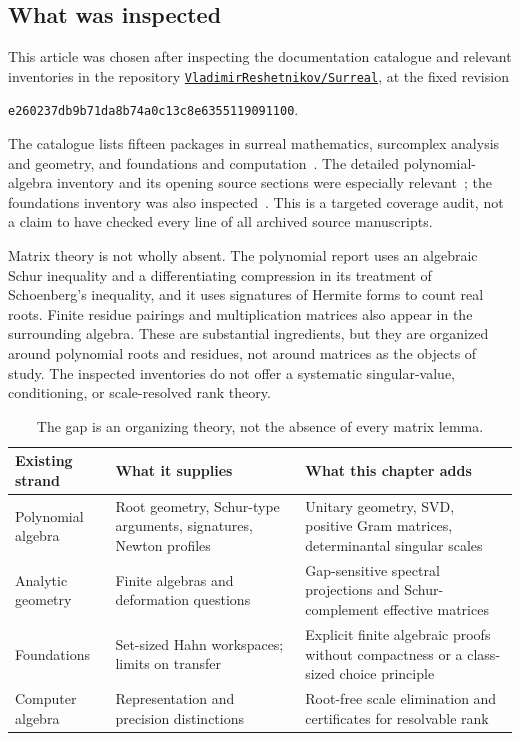 \documentclass[11pt,a4paper]{article}
\numberwithin{equation}{section}
\theoremstyle{definition}
\theoremstyle{remark}
\newcommand{\repocommit}{e260237db9b71da8b74a0c13c8e6355119091100}
\begin{document}
\subsection{What was inspected}
This article was chosen after inspecting the documentation catalogue and
relevant inventories in the repository
\href{https://github.com/VladimirReshetnikov/Surreal}{\texttt{VladimirReshetnikov/Surreal}},
at the fixed revision
\begin{center}\small\texttt{\repocommit}.\end{center}
The catalogue lists fifteen packages in surreal mathematics, surcomplex
analysis and geometry, and foundations and computation~\cite{RepoMap}.
The detailed polynomial-algebra inventory and its opening source sections
were especially relevant~\cite{RepoPoly}; the foundations inventory was
also inspected~\cite{RepoFound}. This is a targeted coverage audit, not a
claim to have checked every line of all archived source manuscripts.

Matrix theory is not wholly absent. The polynomial report uses an algebraic
Schur inequality and a differentiating compression in its treatment of
Schoenberg's inequality, and it uses signatures of Hermite forms to count
real roots. Finite residue pairings and multiplication matrices also appear
in the surrounding algebra. These are substantial ingredients, but they are
organized around polynomial roots and residues, not around matrices as the
objects of study. The inspected inventories do not offer a systematic
singular-value, conditioning, or scale-resolved rank theory.

\begin{table}[ht]
\centering\small
\begin{tabularx}{\textwidth}{@{}p{}LL@{}}
\toprule
Existing strand & What it supplies & What this chapter adds\\
\midrule
Polynomial algebra & Root geometry, Schur-type arguments, signatures,
Newton profiles & Unitary geometry, SVD, positive Gram matrices, determinantal
singular scales\\
Analytic geometry & Finite algebras and deformation questions & Gap-sensitive
spectral projections and Schur-complement effective matrices\\
Foundations & Set-sized Hahn workspaces; limits on transfer & Explicit finite
algebraic proofs without compactness or a class-sized choice principle\\
Computer algebra & Representation and precision distinctions & Root-free
scale elimination and certificates for resolvable rank\\
\bottomrule
\end{tabularx}
\caption{The gap is an organizing theory, not the absence of every matrix lemma.}
\end{table}
\end{document}
